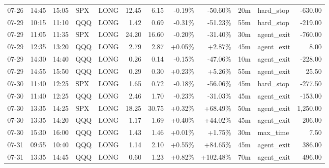 \documentclass[11pt,a4paper,twoside]{article}
\begin{document}
\begin{center}
\begin{longtable}{>{\color{txtmain}}l l l l l r r r r r >{\color{txtmain}}l r}
07-26 & 14:45 & 15:05 & SPX & LONG & 12.45 & 6.15 & \textcolor{lossred}{-0.19\%} & \textcolor{lossred}{-50.60\%} & 20m & hard\_stop & \textcolor{lossred}{-630.00} \\
07-29 & 10:15 & 11:10 & QQQ & LONG & 1.42 & 0.69 & \textcolor{lossred}{-0.31\%} & \textcolor{lossred}{-51.23\%} & 55m & hard\_stop & \textcolor{lossred}{-219.00} \\
07-29 & 11:05 & 11:35 & SPX & LONG & 24.20 & 16.60 & \textcolor{lossred}{-0.20\%} & \textcolor{lossred}{-31.40\%} & 30m & agent\_exit & \textcolor{lossred}{-760.00} \\
07-29 & 12:35 & 13:20 & QQQ & LONG & 2.79 & 2.87 & \textcolor{wingreen}{+0.05\%} & \textcolor{wingreen}{+2.87\%} & 45m & agent\_exit & \textcolor{wingreen}{8.00} \\
07-29 & 14:30 & 14:40 & QQQ & LONG & 0.26 & 0.14 & \textcolor{lossred}{-0.15\%} & \textcolor{lossred}{-47.06\%} & 10m & agent\_exit & \textcolor{lossred}{-228.00} \\
07-29 & 14:55 & 15:50 & QQQ & LONG & 0.29 & 0.30 & \textcolor{wingreen}{+0.23\%} & \textcolor{wingreen}{+5.26\%} & 55m & agent\_exit & \textcolor{wingreen}{25.50} \\
07-30 & 11:40 & 12:25 & SPX & LONG & 1.65 & 0.72 & \textcolor{lossred}{-0.18\%} & \textcolor{lossred}{-56.06\%} & 45m & hard\_stop & \textcolor{lossred}{-277.50} \\
07-30 & 11:40 & 12:25 & QQQ & LONG & 2.46 & 1.70 & \textcolor{lossred}{-0.23\%} & \textcolor{lossred}{-31.03\%} & 45m & agent\_exit & \textcolor{lossred}{-153.00} \\
07-30 & 13:35 & 14:25 & SPX & LONG & 18.25 & 30.75 & \textcolor{wingreen}{+0.32\%} & \textcolor{wingreen}{+68.49\%} & 50m & agent\_exit & \textcolor{wingreen}{1,250.00} \\
07-30 & 13:35 & 14:20 & QQQ & LONG & 1.17 & 1.69 & \textcolor{wingreen}{+0.40\%} & \textcolor{wingreen}{+44.02\%} & 45m & agent\_exit & \textcolor{wingreen}{206.00} \\
07-30 & 15:30 & 16:00 & QQQ & LONG & 1.43 & 1.46 & \textcolor{wingreen}{+0.01\%} & \textcolor{wingreen}{+1.75\%} & 30m & max\_time & \textcolor{wingreen}{7.50} \\
07-31 & 09:55 & 10:40 & QQQ & LONG & 1.14 & 2.10 & \textcolor{wingreen}{+0.55\%} & \textcolor{wingreen}{+84.65\%} & 45m & agent\_exit & \textcolor{wingreen}{386.00} \\
07-31 & 13:35 & 14:45 & QQQ & LONG & 0.60 & 1.23 & \textcolor{wingreen}{+0.82\%} & \textcolor{wingreen}{+102.48\%} & 70m & agent\_exit & \textcolor{wingreen}{496.00} \\

\end{longtable}
\end{center}
\end{document}
